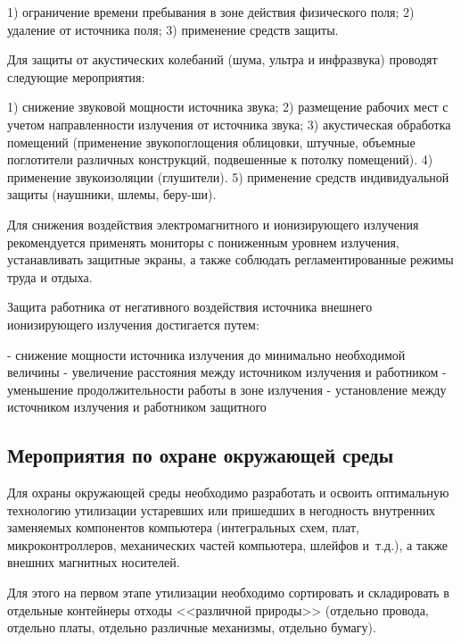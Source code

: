 1) ограничение времени пребывания в зоне действия физического поля;
2) удаление от источника поля;
3) применение средств защиты.

Для защиты от акустических колебаний (шума, ультра и инфразвука) проводят следующие мероприятия:

1) снижение звуковой мощности источника звука;
2) размещение рабочих мест с учетом направленности излучения от источника звука;
3) акустическая обработка помещений (применение звукопоглощения облицовки, штучные, объемные поглотители различных конструкций, подвешенные к потолку помещений).
4) применение звукоизоляции (глушители).
5) применение средств индивидуальной защиты (наушники, шлемы, беру-ши).

Для снижения воздействия электромагнитного и ионизирующего излучения рекомендуется применять мониторы с пониженным уровнем излучения, устанавливать защитные экраны, а также соблюдать регламентированные режимы труда и отдыха.

Защита работника от негативного воздействия источника внешнего ионизирующего излучения достигается путем:

- снижение мощности источника излучения до минимально необходимой величины 
- увеличение расстояния между источником излучения и работником 
- уменьшение продолжительности работы в зоне излучения 
- установление между источником излучения и работником защитного


\subsection{Мероприятия по охране окружающей среды}

Для охраны окружающей среды необходимо разработать и освоить оптимальную технологию утилизации устаревших или пришедших в негодность внутренних заменяемых компонентов компьютера (интегральных схем, плат, микроконтроллеров, механических частей компьютера, шлейфов и~т.д.), а также внешних магнитных носителей.

Для этого на первом этапе утилизации необходимо сортировать и складировать в отдельные контейнеры отходы <<различной природы>> (отдельно провода, отдельно платы, отдельно различные механизмы, отдельно бумагу).

